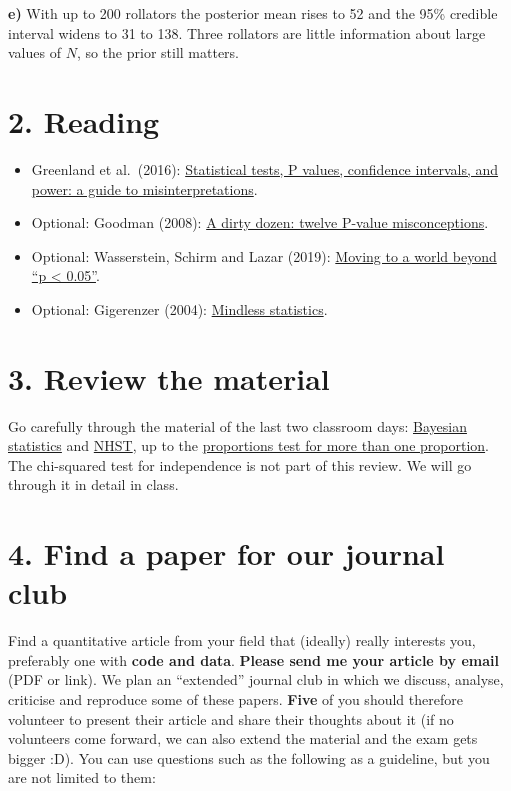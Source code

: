 \documentclass[
]{book}
\providecommand{\tightlist}{%
  \setlength{\itemsep}{0pt}\setlength{\parskip}{0pt}}
\begin{document}
\textbf{e)} With up to 200 rollators the posterior mean rises to 52 and the 95\% credible interval widens to 31 to 138.
Three rollators are little information about large values of \(N\), so the prior still matters.

\section*{2. Reading}\label{reading}

\begin{itemize}
\tightlist
\item
  Greenland et al.~(2016): \href{https://doi.org/10.1007/s10654-016-0149-3}{Statistical tests, P values, confidence intervals, and power: a guide to misinterpretations}.
\item
  Optional: Goodman (2008): \href{https://doi.org/10.1053/j.seminhematol.2008.04.003}{A dirty dozen: twelve P-value misconceptions}.
\item
  Optional: Wasserstein, Schirm and Lazar (2019): \href{https://www.tandfonline.com/doi/full/10.1080/00031305.2019.1583913}{Moving to a world beyond ``p \textless{} 0.05''}.
\item
  Optional: Gigerenzer (2004): \href{https://doi.org/10.1016/j.socec.2004.09.033}{Mindless statistics}.
\end{itemize}

\section*{3. Review the material}\label{review-the-material-1}

Go carefully through the material of the last two classroom days:
\hyperref[bayes_statistics]{Bayesian statistics} and \hyperref[nhst]{NHST}, up to the
\hyperref[proportions_test_more_samples]{proportions test for more than one proportion}.
The chi-squared test for independence is not part of this review. We will go through it in detail in class.

\section*{4. Find a paper for our journal club}\label{find-a-paper-for-our-journal-club}

Find a quantitative article from your field that (ideally) really interests you, preferably one with \textbf{code and data}.
\textbf{Please send me your article by email} (PDF or link).
We plan an ``extended'' journal club in which we discuss, analyse, criticise and reproduce some of these papers.
\textbf{Five} of you should therefore volunteer to present their article and share their thoughts about it
(if no volunteers come forward, we can also extend the material and the exam gets bigger :D).
You can use questions such as the following as a guideline, but you are not limited to them:
\end{document}

